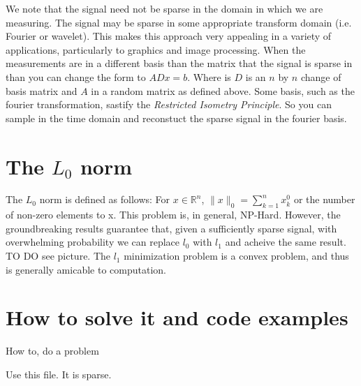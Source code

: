We note that the signal need not be sparse in the domain in which we are measuring. The signal may be sparse in some appropriate transform domain (i.e. Fourier or wavelet). This makes this approach very appealing in a variety of applications, particularly to graphics and image processing. When the measurements are in a different basis than the matrix that the signal is sparse in than you can change the form to $ADx = b$. Where is $D$ is an $n$ by $n$ change of basis matrix and $A$ in a random matrix as defined above. Some basis, such as the fourier transformation, sastify the \emph{Restricted Isometry Principle}. So you can sample in the time domain and reconstuct the sparse signal in the fourier basis.

\section*{The $L_0$ norm}

The $L_0$ norm is defined as follows: For $x \in \mathbb{R}^n$, $\|x\|_0=\sum_{k=1}^n{x_k^0}$ or the number of non-zero elements to x. This problem is, in general, NP-Hard. However, the groundbreaking results  guarantee that, given a sufficiently sparse signal, with overwhelming probability we can replace $l_0$ with $l_1$ and acheive the same result.
TO DO see picture.
The $l_1$ minimization problem is a convex problem, and thus is generally amicable to computation.

\section*{How to solve it and code examples}


\begin{problem}
How to, do a problem
\end{problem}

\begin{problem}
Use this file. It is sparse.
\end{problem}



